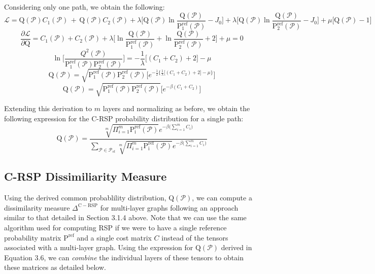 Considering only one path, we obtain the following:
\[
\mathcal{L}   = \mathrm{Q}(\mathcal{P})C_1(\mathcal{P}) \,+ \,\mathrm{Q}(\mathcal{P})C_2(\mathcal{P})   +  \lambda \Bigg\lbrack \mathrm{Q}(\mathcal{P}) \ln \frac{\mathrm{Q}(\mathcal{P}) } { \mathrm{P_1^{ref}}(\mathcal{P})} - J_0 \Bigg\rbrack + \lambda \Bigg\lbrack \mathrm{Q}(\mathcal{P}) \ln \frac{\mathrm{Q}(\mathcal{P}) } { \mathrm{P_2^{ref}}(\mathcal{P})} - J_0 \Bigg\rbrack + \mu\Bigg\lbrack \mathrm{Q}(\mathcal{P}) - 1 \Bigg\rbrack  
\]
\[
\frac{\partial \mathcal{L}}{\partial \mathrm{Q}} = C_1(\mathcal{P}) + C_2(\mathcal{P}) + \lambda \Bigg\lbrack  \ln \frac{\mathrm{Q}(\mathcal{P}) }{ \mathrm{P_1^{ref}}(\mathcal{P})} + \ln \frac{\mathrm{Q}(\mathcal{P}) }{ \mathrm{P_2^{ref}}(\mathcal{P})} + 2\Bigg\rbrack  + \mu= 0
\]
\[
\ln \Bigg\lbrack\frac{Q^2( \mathcal{P})}{  \mathrm{P_1^{ref}}(\mathcal{P})  \mathrm{P_2^{ref}}(\mathcal{P})}\Bigg\rbrack = -\frac{1}{\lambda}\Bigg\lbrack( C_1 + C_2) + 2 \Bigg\rbrack  - \mu
\]
\[
\mathrm{Q}( \mathcal{P}) = \sqrt{\mathrm{P_1^{ref}}(\mathcal{P})\mathrm{P_2^{ref}}(\mathcal{P}) } \Big\lbrack e^{-\frac{1}{2} \{  \frac{1}{\lambda}\lbrack( C_1 + C_2) + 2 \rbrack  - \mu   \}}\Big\rbrack
\]
\[
\mathrm{Q}( \mathcal{P}) = \sqrt{\mathrm{P_1^{ref}}(\mathcal{P})\mathrm{P_2^{ref}}(\mathcal{P}) }\Big\lbrack e^{- \beta (C_1 + C_2) }\Big \rbrack
\]

Extending this derivation to $m$ layers and normalizing as before, we obtain the following expression for the C-RSP probability distribution for a single path:
\begin{equation}
\mathrm{Q}( \mathcal{P}) = \frac{\sqrt[m]{\Pi_{i=1}^{m}\mathrm{P_i^{ref}}(\mathcal{P})}  e^{- \beta \Big(\sum\limits_{i=1}^{m} C_i\Big) }} {\sum\limits_{\mathcal{P} \in \mathcal{P}_{st}}\sqrt[m]{\Pi_{i=1}^{m}\mathrm{P_i^{ref}}(\mathcal{P})}  e^{- \beta \Big(\sum\limits_{i=1}^{m} C_i\Big) }}
\end{equation}

\subsection{C-RSP Dissimiliarity Measure}
Using the derived common probablility distribution, $\mathrm{Q}(\mathcal{P})$, we can compute a dissimilarity measure $\Delta^{\mathrm{C-RSP}}$ for multi-layer graphs following an approach similar to that detailed in Section 3.1.4 above. Note that we can use the same algorithm used for computing RSP if we were to have a single reference probability matrix $\mathrm{P^{ref}}$ and a single cost matrix $C$ instead of the tensors associated with a multi-layer graph. Using the expression for $\mathrm{Q}(\mathcal{P})$ derived in Equation 3.6, we can \emph{combine} the individual layers of these tensors to obtain these matrices as detailed below.

